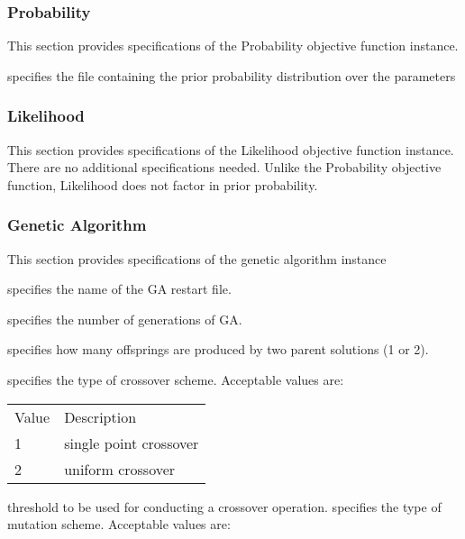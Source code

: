  
 \subsubsection{Probability} \label{sssec:probability}
 This section provides specifications of the Probability objective function
 instance.
 

 
  specifies the file containing the 
  prior probability distribution over the parameters
 

 
 \subsubsection{Likelihood} \label{sssec:likelihood}
 This section provides specifications of the Likelihood objective function
 instance.  There are no additional specifications needed.  Unlike the Probability
 objective function, Likelihood does not factor in prior probability.
 

 
 \subsubsection{Genetic Algorithm} \label{ssec:ga}
 This section provides specifications of the genetic algorithm instance
 

 
  specifies the name of the 
 GA restart file.

  specifies the 
 number of generations of GA.

  specifies how many 
 offsprings are produced by two parent solutions (1 or 2).

  specifies the type of crossover
 scheme.
 Acceptable values are:

 \begin{tabular}{ll}
 Value & Description            \\
 1     & single point crossover \\
 2     & uniform crossover      \\
 \end{tabular}

  threshold to be used for 
 conducting a crossover operation.
  specifies the type of mutation
 scheme.
 Acceptable values are:

